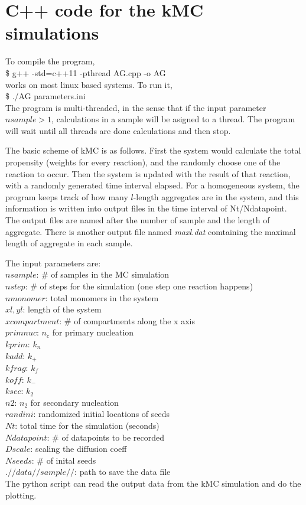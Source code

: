 \documentclass[12pt]{article}
\begin{document}
\section*{C++ code for the kMC simulations}

To compile the program, \\
\$ g++ -std=c++11 -pthread AG.cpp -o AG
\\
works on most linux based systems. To run it, \\
\$ ./AG parameters.ini
\\
The program is multi-threaded, in the sense that if the input parameter $nsample > 1$, calculations in a sample will be asigned to a thread. The program will wait until all threads are done calculations and then stop.

The basic scheme of kMC is as follows. First the system would calculate the total propensity (weights for every reaction), and the randomly choose one of the reaction to occur. Then the system is updated with the result of that reaction, with a randomly generated time interval elapsed. For a homogeneous system, the program keeps track of how many $l$-length aggregates are in the system, and this information is written into output files in the time interval of Nt/Ndatapoint. The output files are named after the number of sample and the length of aggregate. There is another output file named \textit{maxl.dat} comtaining the maximal length of aggregate in each sample.

The input parameters are: \\
$nsample$: \# of samples in the MC simulation\\
$nstep$: \# of steps for the simulation (one step one reaction happens)\\
$nmonomer$: total monomers in the system\\
$xl, yl$: length of the system\\
$xcompartment$: \# of compartments along the x axis\\
$primnuc$: $n_c$ for primary nucleation\\
$kprim$: $k_n$\\
$kadd$: $k_+$\\
$kfrag$: $k_f$\\
$koff$: $k_-$\\
$ksec$: $k_2$\\
$n2$: $n_2$ for secondary nucleation\\
$randini$: randomized initial locations of seeds\\
$Nt$: total time for the simulation (seconds)\\
$Ndatapoint$: \# of datapoints to be recorded\\
$Dscale$: scaling the diffusion coeff\\
$Nseeds$: \# of inital seeds\\
$.//data//sample//$: path to save the data file\\

The python script can read the output data from the kMC simulation and do the plotting.
\end{document}
